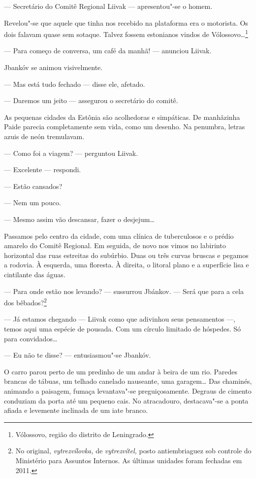 --- Secretário do Comitê Regional Liivak --- apresentou"-se
o homem.

Revelou"-se que aquele que tinha nos recebido na plataforma era o
motorista. Os dois falavam quase sem sotaque. Talvez fossem estonianos
vindos de Vólossovo\ldots{}\footnote{Vólossovo, região do distrito de
  Leningrado.}

--- Para começo de conversa, um café da manhã! ---
anunciou Liivak.

Jbankóv se animou visivelmente.

--- Mas está tudo fechado --- disse ele, afetado.

--- Daremos um jeito --- assegurou o secretário do comitê.

As pequenas cidades da Estônia são acolhedoras e simpáticas. De
manhãzinha Paide parecia completamente sem vida, como um desenho. Na
penumbra, letras azuis de neón tremulavam.

--- Como foi a viagem? --- perguntou Liivak.

--- Excelente --- respondi.

--- Estão cansados?

--- Nem um pouco.

--- Mesmo assim vão descansar, fazer o desjejum\ldots{}

Passamos pelo centro da cidade, com uma clínica de tuberculosos e o
prédio amarelo do Comitê Regional. Em seguida, de novo nos vimos no
labirinto horizontal das ruas estreitas do subúrbio. Duas ou três curvas
bruscas e pegamos a rodovia. À esquerda, uma floresta. À direita, o
litoral plano e a superfície lisa e cintilante das águas.

--- Para onde estão nos levando? --- sussurrou Jbánkov.
--- Será que para a cela dos bêbados?\footnote{No original,
  \emph{vytrezvílovka,} de \emph{vytrezvítel,} posto antiembriaguez sob
  controle do Ministério para Assuntos Internos. As últimas unidades
  foram fechadas em 2011.}

--- Já estamos chegando --- Liivak como que adivinhou seus
pensamentos ---, temos aqui uma espécie de pousada. Com um
círculo limitado de hóspedes. Só para convidados\ldots{}

--- Eu não te disse? --- entusiasmou"-se Jbankóv.

O carro parou perto de um predinho de um andar à beira de um rio.
Paredes brancas de tábuas, um telhado canelado nauseante, uma garagem\ldots{}
Das chaminés, animando a paisagem, fumaça levantava"-se preguiçosamente.
Degraus de cimento conduziam da porta até um pequeno cais. No
atracadouro, destacava"-se a ponta afiada e levemente inclinada de um
iate branco.

